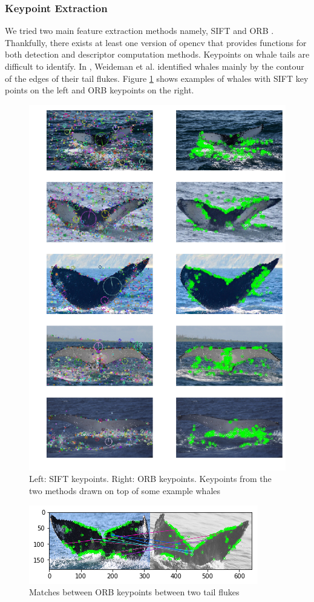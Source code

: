 \subsubsection{Keypoint Extraction}

We tried two main feature extraction methods namely, SIFT \cite{lowe2004distinctive} and ORB \cite{rublee2011orb}. Thankfully, there exists at least one version of opencv that provides functions for both detection and descriptor computation methods. Keypoints on whale tails are difficult to identify. In \cite{weideman2017integral}, Weideman et al. identified whales mainly by the contour of the edges of their tail flukes. Figure \ref{fig:whalekp} shows examples of whales with SIFT key points on the left and ORB keypoints on the right.

\begin{figure}[ht]
	\centering
	\includegraphics[width=.5\linewidth]{images/kp_side_by_side.png}
	\caption{\label{fig:whalekp}Left: SIFT keypoints. Right: ORB keypoints. Keypoints from the two methods drawn on top of some example whales}
\end{figure}
\begin{figure}[h]
	\centering
	\includegraphics[width=.8\linewidth]{images/orb_matches.png}
	\caption{\label{fig:orbmatch}Matches between ORB keypoints between two tail flukes}
\end{figure}

